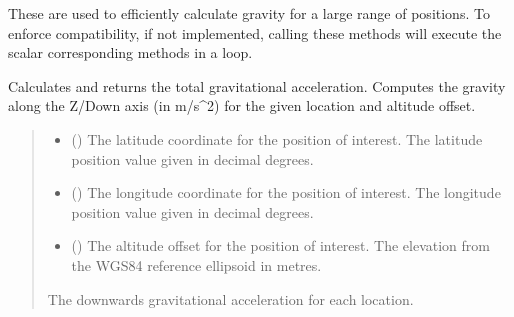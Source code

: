 \documentclass[letterpaper,10pt,english]{sphinxmanual}
\begin{document}
\begin{fulllineitems}
\sphinxAtStartPar
These are used to efficiently calculate gravity for a large range of
positions. To enforce compatibility, if not implemented, calling these
methods will execute the scalar corresponding methods in a loop.

\begin{fulllineitems}
\label{\detokenize{modules/gravity/base:qnav.gravity.base.GravityModel.calc_gravity_z}}
\pysigstartsignatures
{}
\pysigstopsignatures
\sphinxAtStartPar
Calculates and returns the total gravitational acceleration.
Computes the gravity along the Z/Down axis (in m/s\textasciicircum{}2) for
the given location and altitude offset.
\begin{quote}\begin{description}
\begin{itemize}
\item {} 
\sphinxAtStartPar
{} () \textendash{} The latitude coordinate for the position of interest.
The latitude position value given in decimal degrees.

\item {} 
\sphinxAtStartPar
{} () \textendash{} The longitude coordinate for the position of interest.
The longitude position value given in decimal degrees.

\item {} 
\sphinxAtStartPar
{} () \textendash{} The altitude offset for the position of interest.
The elevation from the WGS\sphinxhyphen{}84 reference ellipsoid in metres.

\end{itemize}

\sphinxAtStartPar
The downwards gravitational acceleration for each location.


\end{description}
\end{quote}
\end{fulllineitems}
\end{fulllineitems}
\end{document}
